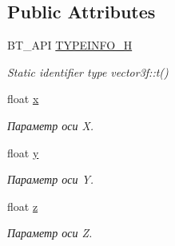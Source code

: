 \subsection*{Public Attributes}
\begin{DoxyCompactItemize}
\item 
\hypertarget{classbt_1_1vector3f_a82674b9475b3746b66eba713cf2ec6d4}{B\-T\-\_\-\-A\-P\-I \hyperlink{classbt_1_1vector3f_a82674b9475b3746b66eba713cf2ec6d4}{T\-Y\-P\-E\-I\-N\-F\-O\-\_\-\-H}}\label{classbt_1_1vector3f_a82674b9475b3746b66eba713cf2ec6d4}

\begin{DoxyCompactList}\small\item\em Static identifier type vector3f\-::t() \end{DoxyCompactList}\item 
\hypertarget{classbt_1_1vector3f_a8f8d10a667213cfd3892876225cb79a1}{float \hyperlink{classbt_1_1vector3f_a8f8d10a667213cfd3892876225cb79a1}{x}}\label{classbt_1_1vector3f_a8f8d10a667213cfd3892876225cb79a1}

\begin{DoxyCompactList}\small\item\em Параметр оси X. \end{DoxyCompactList}\item 
\hypertarget{classbt_1_1vector3f_ac4fe6532bffb20630043150dbee3c9e7}{float \hyperlink{classbt_1_1vector3f_ac4fe6532bffb20630043150dbee3c9e7}{y}}\label{classbt_1_1vector3f_ac4fe6532bffb20630043150dbee3c9e7}

\begin{DoxyCompactList}\small\item\em Параметр оси Y. \end{DoxyCompactList}\item 
\hypertarget{classbt_1_1vector3f_a8625c7ea913218123d93f8effa81512c}{float \hyperlink{classbt_1_1vector3f_a8625c7ea913218123d93f8effa81512c}{z}}\label{classbt_1_1vector3f_a8625c7ea913218123d93f8effa81512c}

\begin{DoxyCompactList}\small\item\em Параметр оси Z. \end{DoxyCompactList}\end{DoxyCompactItemize}
